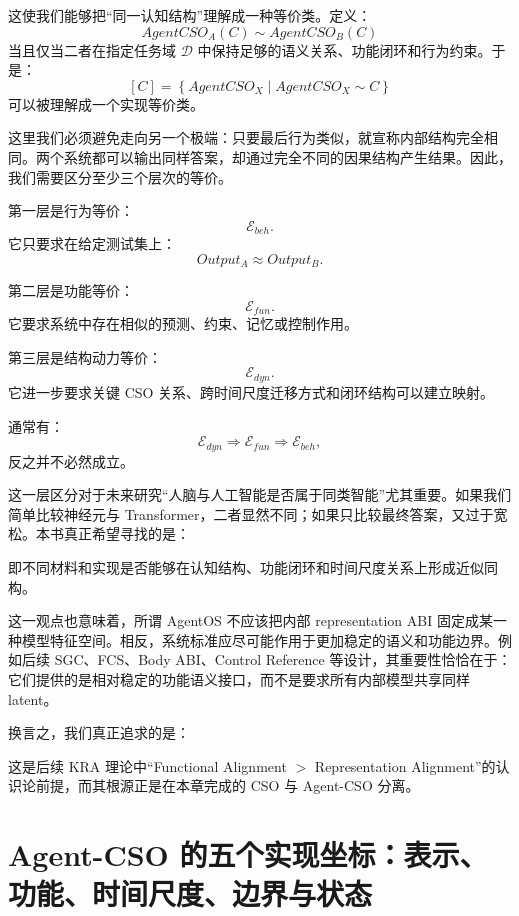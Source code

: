 这使我们能够把“同一认知结构”理解成一种等价类。定义：
\[
AgentCSO_A(C)
\sim
AgentCSO_B(C)
\]
当且仅当二者在指定任务域 $\mathcal D$ 中保持足够的语义关系、功能闭环和行为约束。于是：
\[
[C]
=
\left\{
AgentCSO_X
\mid
AgentCSO_X\sim C
\right\}
\]
可以被理解成一个实现等价类。

这里我们必须避免走向另一个极端：只要最后行为类似，就宣称内部结构完全相同。两个系统都可以输出同样答案，却通过完全不同的因果结构产生结果。因此，我们需要区分至少三个层次的等价。

第一层是行为等价：
\[
\mathcal E_{beh}.
\]
它只要求在给定测试集上：
\[
Output_A\approx Output_B.
\]

第二层是功能等价：
\[
\mathcal E_{fun}.
\]
它要求系统中存在相似的预测、约束、记忆或控制作用。

第三层是结构动力等价：
\[
\mathcal E_{dyn}.
\]
它进一步要求关键 CSO 关系、跨时间尺度迁移方式和闭环结构可以建立映射。

通常有：
\[
\mathcal E_{dyn}
\Rightarrow
\mathcal E_{fun}
\Rightarrow
\mathcal E_{beh},
\]
反之并不必然成立。

这一层区分对于未来研究“人脑与人工智能是否属于同类智能”尤其重要。如果我们简单比较神经元与 Transformer，二者显然不同；如果只比较最终答案，又过于宽松。本书真正希望寻找的是：
\begin{statementbox}
\centering
{}
\end{statementbox}
即不同材料和实现是否能够在认知结构、功能闭环和时间尺度关系上形成近似同构。

这一观点也意味着，所谓 AgentOS 不应该把内部 representation ABI 固定成某一种模型特征空间。相反，系统标准应尽可能作用于更加稳定的语义和功能边界。例如后续 SGC、FCS、Body ABI、Control Reference 等设计，其重要性恰恰在于：它们提供的是相对稳定的功能语义接口，而不是要求所有内部模型共享同样 latent。

换言之，我们真正追求的是：
\begin{statementbox}
\centering
{}
\end{statementbox}
这是后续 KRA 理论中“Functional Alignment $>$ Representation Alignment”的认识论前提，而其根源正是在本章完成的 CSO 与 Agent-CSO 分离。

\section{Agent-CSO 的五个实现坐标：表示、功能、时间尺度、边界与状态}

